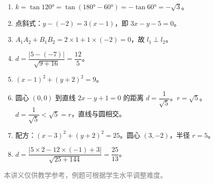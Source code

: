 \documentclass[12pt, a4paper]{ctexart}
\begin{document}
\begin{knowledgebox}[参考答案]
\begin{enumerate}
  \item $k = \tan 120° = \tan(180° - 60°) = -\tan 60° = -\sqrt{3}$。

  \item 点斜式：$y - (-2) = 3(x - 1)$，即 $3x - y - 5 = 0$。

  \item $A_1A_2 + B_1B_2 = 2 \times 1 + 1 \times (-2) = 0$，故 $l_1 \perp l_2$。

  \item $d = \dfrac{|5 - (-7)|}{\sqrt{9 + 16}} = \dfrac{12}{5}$。

  \item $(x - 1)^2 + (y + 2)^2 = 9$。

  \item 圆心 $(0, 0)$ 到直线 $2x - y + 1 = 0$ 的距离 $d = \dfrac{1}{\sqrt{5}}$。$r = \sqrt{5}$。$d = \dfrac{1}{\sqrt{5}} < \sqrt{5} = r$，直线与圆相交。

  \item 配方：$(x - 3)^2 + (y + 2)^2 = 25$。圆心 $(3, -2)$，半径 $r = 5$。

  \item $d = \dfrac{|5 \times 2 - 12 \times (-1) + 3|}{\sqrt{25 + 144}} = \dfrac{25}{13}$。
\end{enumerate}
\end{knowledgebox}

\vfill
\begin{center}
\small\textcolor{gray}{本讲义仅供教学参考，例题可根据学生水平调整难度。}
\end{center}
\end{document}
